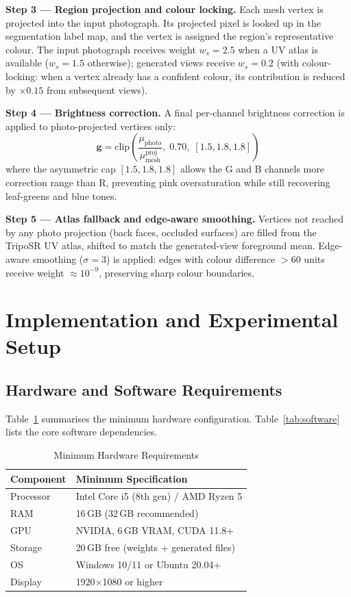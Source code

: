 \documentclass[conference]{IEEEtran}
\begin{document}
\textbf{Step 3 — Region projection and colour locking.}
Each mesh vertex is projected into the input photograph. Its projected pixel is looked up in the segmentation
label map, and the vertex is assigned the region's representative colour. The input photograph receives weight $w_s = 2.5$ when a UV atlas is available ($w_s = 1.5$ otherwise); generated views receive $w_s = 0.2$ (with colour-locking: when a vertex already
has a confident colour, its contribution is reduced by $\times 0.15$ from subsequent views).

\textbf{Step 4 — Brightness correction.}
A final per-channel brightness correction is applied to photo-projected vertices only:
\begin{equation}
\mathbf{g} = \mathrm{clip}\!\left(\frac{\mu_{\text{photo}}}{\mu_{\text{mesh}}^{\text{proj}}},\; 0.70,\; [1.5, 1.8, 1.8]\right)
\end{equation}
where the asymmetric cap $[1.5, 1.8, 1.8]$ allows the G and B channels more correction range than R, preventing
pink oversaturation while still recovering leaf-greens and blue tones.

\textbf{Step 5 — Atlas fallback and edge-aware smoothing.}
Vertices not reached by any photo projection (back faces, occluded surfaces) are filled from the TripoSR UV
atlas, shifted to match the generated-view foreground mean. Edge-aware smoothing ($\sigma = 3$) is applied:
edges with colour difference $> 60$ units receive weight $\approx 10^{-9}$, preserving sharp colour boundaries.

\section{Implementation and Experimental Setup}

\subsection{Hardware and Software Requirements}

Table~\ref{tab:hardware} summarises the minimum hardware configuration. Table~\ref{tab:software} lists the
core software dependencies.

\begin{table}[htbp]
\caption{Minimum Hardware Requirements}
\label{tab:hardware}
\centering
\begin{tabular}{ll}
\toprule
\textbf{Component} & \textbf{Minimum Specification} \\
\midrule
Processor & Intel Core i5 (8th gen) / AMD Ryzen 5 \\
RAM & 16\,GB (32\,GB recommended) \\
GPU & NVIDIA, 6\,GB VRAM, CUDA 11.8+ \\
Storage & 20\,GB free (weights + generated files) \\
OS & Windows 10/11 or Ubuntu 20.04+ \\
Display & 1920$\times$1080 or higher \\
\bottomrule
\end{tabular}
\end{table}
\end{document}
